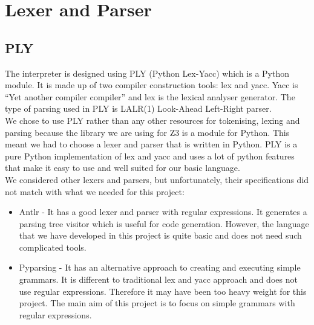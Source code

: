 \documentclass[a4paper]{report}
\begin{document}
\section{Lexer and Parser} 
\subsection{PLY}
The interpreter is designed using PLY\cite{ply} (Python Lex-Yacc) which is a Python module. It is made up of two compiler construction tools: lex and yacc\cite{plylexyacc}. Yacc is ``Yet another compiler compiler'' and lex is the lexical analyser generator. The type of parsing used in PLY is LALR(1)\cite{lalr} Look-Ahead Left-Right parser.\\

We chose to use PLY rather than any other resources for tokenising, lexing and parsing because the library we are using for Z3 is a module for Python. This meant we had to choose a lexer and parser that is written in Python. PLY is a pure Python implementation of lex and yacc and uses a lot of python features that make it easy to use and well suited for our basic language. \\

We considered other lexers and parsers, but unfortunately, their specifications did not match with what we needed for this project:
\begin{itemize}
\item Antlr\cite{antlr} - It has a good lexer and parser with regular expressions. It generates a parsing tree visitor which is useful for code generation. However, the language that we have developed in this project is quite basic and does not need such complicated tools.
\item Pyparsing\cite{pyparsing} - It has an alternative approach to creating and executing simple grammars. It is different to traditional lex and yacc approach and does not use regular expressions. Therefore it may have been too heavy weight for this project. The main aim of this project is to focus on simple grammars with regular expressions.
\end{itemize}

\newpage
\end{document}
